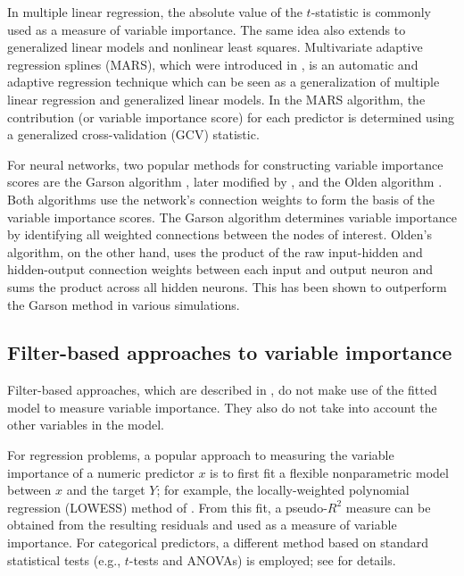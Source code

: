 \documentclass[12pt]{article}
\begin{document}
In multiple linear regression, the absolute value of the $t$-statistic is commonly used as a measure of variable importance. The same idea also extends to generalized linear models and nonlinear least squares. Multivariate adaptive regression splines (MARS), which were introduced in \citet{friedman-1991-mars}, is an automatic and adaptive regression technique which can be seen as a generalization of multiple linear regression and generalized linear models. In the MARS algorithm, the contribution (or variable importance score) for each predictor is determined using a generalized cross-validation (GCV) statistic.

For neural networks, two popular methods for constructing variable importance scores are the Garson algorithm \citep{interpreting-garson-1991}, later modified by \citet{back-goh-1995}, and the Olden algorithm \citep{accurate-olden-2004}. Both algorithms use the network's connection weights to form the basis of the variable importance scores. The Garson algorithm determines variable importance by identifying all weighted connections between the nodes of interest. Olden's algorithm, on the other hand, uses the product of the raw input-hidden and hidden-output connection weights between each input and output neuron and sums the product across all hidden neurons. This has been shown to outperform the Garson method in various simulations.


\subsection{Filter-based approaches to variable importance}

Filter-based approaches, which are described in \citet[chap. 18]{applied-kuhn-2013}, do not make use of the fitted model to measure variable importance. They also do not take into account the other variables in the model.

For regression problems, a popular approach to measuring the variable importance of a numeric predictor $x$ is to first fit a flexible nonparametric model between $x$ and the target $Y$; for example, the locally-weighted polynomial regression (LOWESS) method of \citet{robust-cleveland-1979}. From this fit, a pseudo-$R^2$ measure can be obtained from the resulting residuals and used as a measure of variable importance. For categorical predictors, a different method based on standard statistical tests (e.g., $t$-tests and ANOVAs) is employed; see \citet[chap. 18]{applied-kuhn-2013} for details.
\end{document}
